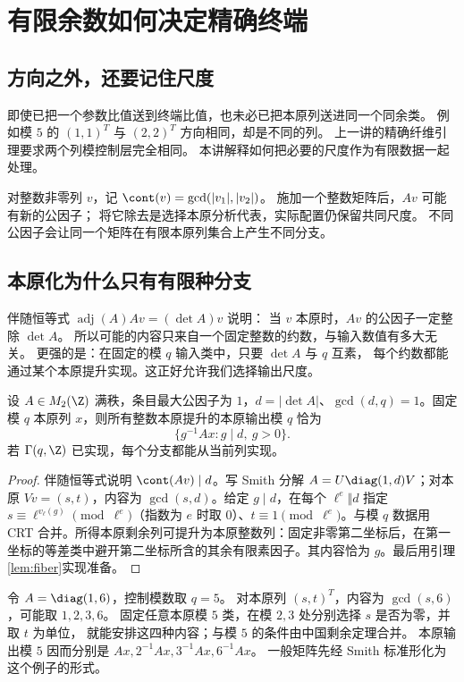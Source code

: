 \chapter{有限余数如何决定精确终端}\label{sec:controllers}

\section{方向之外，还要记住尺度}
即使已把一个参数比值送到终端比值，也未必已把本原列送进同一个同余类。
例如模 $5$ 的 $(1,1)^T$ 与 $(2,2)^T$ 方向相同，却是不同的列。
上一讲的精确纤维引理要求两个列模控制层完全相同。
本讲解释如何把必要的尺度作为有限数据一起处理。

对整数非零列 $v$，记 $\cont(v)=\gcd(|v_1|,|v_2|)$。
施加一个整数矩阵后，$Av$ 可能有新的公因子；
将它除去是选择本原分析代表，实际配置仍保留共同尺度。
不同公因子会让同一个矩阵在有限本原列集合上产生不同分支。


\section{本原化为什么只有有限种分支}
伴随恒等式 $\operatorname{adj}(A)Av=(\det A)v$ 说明：
当 $v$ 本原时，$Av$ 的公因子一定整除 $\det A$。
所以可能的内容只来自一个固定整数的约数，与输入数值有多大无关。
更强的是：在固定的模 $q$ 输入类中，只要 $\det A$ 与 $q$ 互素，
每个约数都能通过某个本原提升实现。这正好允许我们选择输出尺度。

\begin{lemma}[本原化的全部有限分支]\label{lem:content}
设 $A\in M_2(\Z)$ 满秩，条目最大公因子为 $1$，$d=|\det A|$、$\gcd(d,q)=1$。固定模 $q$ 本原列 $x$，则所有整数本原提升的本原输出模 $q$ 恰为
\begin{equation}\label{eq:content}
\{g^{-1}Ax:g\mid d,\ g>0\}.
\end{equation}
若 $\Gamma(q,\Z)$ 已实现，每个分支都能从当前列实现。
\end{lemma}
\begin{proof}
伴随恒等式说明 $\cont(Av)\mid d$。写 Smith 分解 $A=U\diag(1,d)V$；对本原 $Vv=(s,t)$，内容为 $\gcd(s,d)$。给定 $g\mid d$，在每个 $\ell^e\Vert d$ 指定 $s\equiv\ell^{v_\ell(g)}\pmod{\ell^e}$（指数为 $e$ 时取 $0$）、$t\equiv1\pmod{\ell^e}$。与模 $q$ 数据用 CRT 合并。所得本原剩余列可提升为本原整数列：固定非零第二坐标后，在第一坐标的等差类中避开第二坐标所含的其余有限素因子。其内容恰为 $g$。最后用引理\ref{lem:fiber}实现准备。
\end{proof}


\begin{example}[一个内容分支的具体样子]
令 $A=\diag(1,6)$，控制模数取 $q=5$。
对本原列 $(s,t)^T$，内容为 $\gcd(s,6)$，可能取 $1,2,3,6$。
固定任意本原模 $5$ 类，在模 $2,3$ 处分别选择 $s$ 是否为零，并取 $t$ 为单位，
就能安排这四种内容；与模 $5$ 的条件由中国剩余定理合并。
本原输出模 $5$ 因而分别是 $Ax,2^{-1}Ax,3^{-1}Ax,6^{-1}Ax$。
一般矩阵先经 Smith 标准形化为这个例子的形式。
\end{example}

